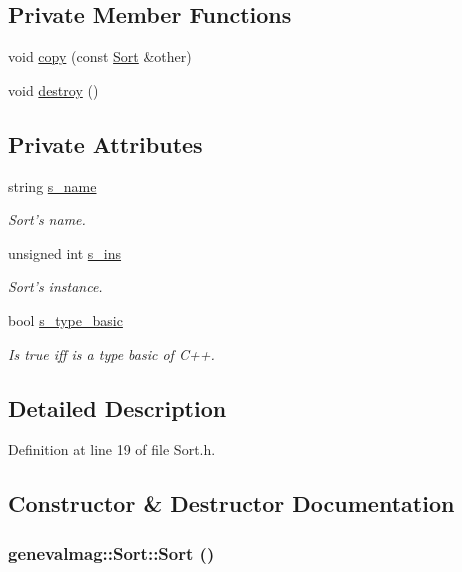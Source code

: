 \subsection*{Private Member Functions}
\begin{CompactItemize}
\item 
void \hyperlink{classgenevalmag_1_1Sort_b9686f0d43855db1167b7cf634d9d1fa}{copy} (const \hyperlink{classgenevalmag_1_1Sort}{Sort} \&other)
\item 
void \hyperlink{classgenevalmag_1_1Sort_c9c0f0525a72b060e253409712eafd70}{destroy} ()
\end{CompactItemize}
\subsection*{Private Attributes}
\begin{CompactItemize}
\item 
string \hyperlink{classgenevalmag_1_1Sort_e6d8c2bf79cf548f731bbd4d7d9b1f4e}{s\_\-name}
\begin{CompactList}\small\item\em Sort's name. \item\end{CompactList}\item 
unsigned int \hyperlink{classgenevalmag_1_1Sort_dc3a9ea4bfaabbb0879c18172f670ef8}{s\_\-ins}
\begin{CompactList}\small\item\em Sort's instance. \item\end{CompactList}\item 
bool \hyperlink{classgenevalmag_1_1Sort_063c9ca680a72b50a2018473d3be47c7}{s\_\-type\_\-basic}
\begin{CompactList}\small\item\em Is true iff is a type basic of C++. \item\end{CompactList}\end{CompactItemize}


\subsection{Detailed Description}


Definition at line 19 of file Sort.h.

\subsection{Constructor \& Destructor Documentation}
\hypertarget{classgenevalmag_1_1Sort_e16fdd544e5e88954b272d746014b34f}{
\subsubsection[{Sort}]{\setlength{\rightskip}{0pt plus 5cm}genevalmag::Sort::Sort ()}}
\label{classgenevalmag_1_1Sort_e16fdd544e5e88954b272d746014b34f}


